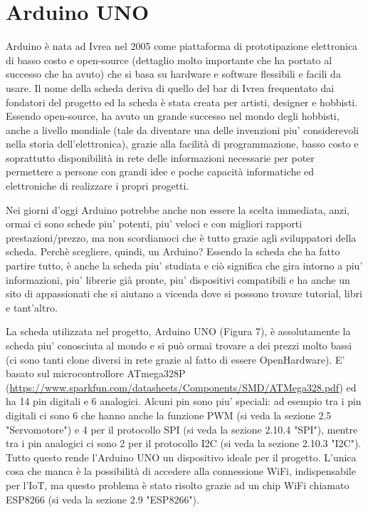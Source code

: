 \documentclass[12pt]{report}
\begin{document}
\section{Arduino UNO}
%

Arduino\cite{arduino_storia} è nata ad Ivrea nel 2005 come piattaforma di prototipazione elettronica di basso costo e open-source (dettaglio molto importante che ha portato al successo che ha avuto) che si basa su hardware e software flessibili e facili da usare. Il nome della scheda deriva di quello del bar di Ivrea frequentato dai fondatori del progetto ed la scheda è stata creata per artisti, designer e hobbisti. Essendo open-source, ha avuto un grande successo nel mondo degli hobbisti, anche a livello mondiale (tale da diventare una delle invenzioni piu' considerevoli nella storia dell'elettronica), grazie alla facilità di programmazione, basso costo e soprattutto disponibilità in rete delle informazioni necessarie per poter permettere a persone con grandi idee e poche capacità informatiche ed elettroniche di realizzare i propri progetti. 

Nei giorni d'oggi Arduino potrebbe anche non essere la scelta immediata, anzi, ormai ci sono schede piu' potenti, piu' veloci e con migliori rapporti prestazioni/prezzo, ma non scordiamoci che è tutto grazie agli sviluppatori della scheda. Perchè scegliere, quindi, un Arduino? Essendo la scheda che ha fatto partire tutto, è anche la scheda piu' studiata e ciò significa che gira intorno a piu' informazioni, piu' librerie già pronte, piu' dispositivi compatibili e ha anche un sito di appassionati che si aiutano a vicenda dove si possono trovare tutorial, libri e tant'altro.

La scheda utilizzata nel progetto, Arduino UNO (Figura 7), è assolutamente la scheda piu' conosciuta al mondo e si può ormai trovare a dei prezzi molto bassi (ci sono tanti clone diversi in rete grazie al fatto di essere OpenHardware). E' basato sul microcontrollore ATmega328P (\url{https://www.sparkfun.com/datasheets/Components/SMD/ATMega328.pdf}) ed ha 14 pin digitali e 6 analogici. Alcuni pin sono piu' speciali: ad esempio tra i pin digitali ci sono 6 che hanno anche la funzione PWM (si veda la sezione 2.5 "Servomotore") e 4 per il protocollo SPI (si veda la sezione 2.10.4 "SPI"), mentre tra i pin analogici ci sono 2 per il protocollo I2C (si veda la sezione 2.10.3 "I2C"). Tutto questo rende l'Arduino UNO un dispositivo ideale per il progetto. L'unica cosa che manca è la possibilità di accedere alla connessione WiFi, indispensabile per l'IoT, ma questo problema è stato risolto grazie ad un chip WiFi chiamato ESP8266 (si veda la sezione 2.9 "ESP8266").
\end{document}
